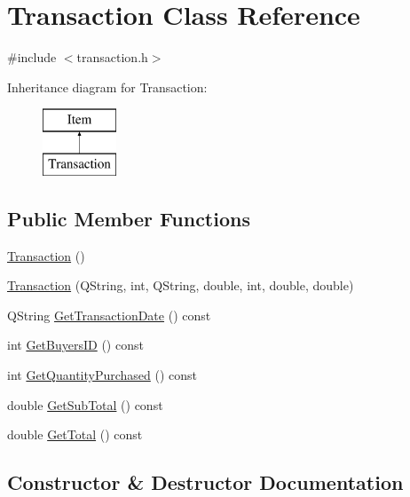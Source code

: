 \hypertarget{class_transaction}{}\section{Transaction Class Reference}
\label{class_transaction}


{\ttfamily \#include $<$transaction.\+h$>$}

Inheritance diagram for Transaction\+:\begin{figure}[H]
\begin{center}
\leavevmode
\includegraphics[height=2.000000cm]{class_transaction}
\end{center}
\end{figure}
\subsection*{Public Member Functions}
\begin{DoxyCompactItemize}
\item 
\hyperlink{class_transaction_ab47005b855d38bc324bb79fd023baa13}{Transaction} ()
\item 
\hyperlink{class_transaction_ab581494699944e7d297344a6c2d26f56}{Transaction} (Q\+String, int, Q\+String, double, int, double, double)
\item 
Q\+String \hyperlink{class_transaction_abc9ae64b163a7956d13c4ac11c8a5f55}{Get\+Transaction\+Date} () const
\item 
int \hyperlink{class_transaction_a58d5c852fc5ca0599df9298d23996bde}{Get\+Buyers\+ID} () const
\item 
int \hyperlink{class_transaction_a3edb74863df1a30670611c0d8b50a0fb}{Get\+Quantity\+Purchased} () const
\item 
double \hyperlink{class_transaction_afa1626bf3906a25d6c53aace91b4458f}{Get\+Sub\+Total} () const
\item 
double \hyperlink{class_transaction_ab70e25b411284645e6ebe69e6d26f69f}{Get\+Total} () const
\end{DoxyCompactItemize}


\subsection{Constructor \& Destructor Documentation}
\mbox{\label{class_transaction_ab47005b855d38bc324bb79fd023baa13}} 
